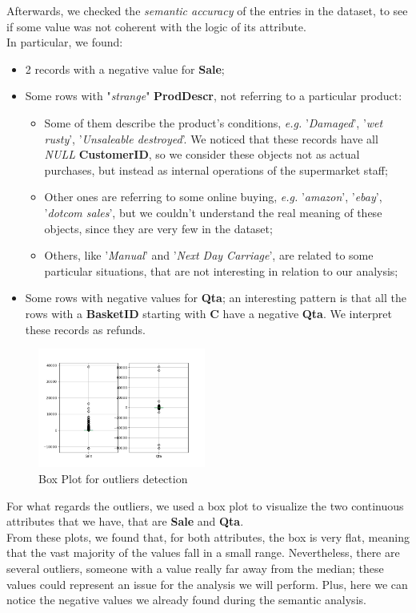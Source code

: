 Afterwards, we checked the \emph{semantic accuracy} of the entries in the dataset, to see if some value was not coherent with the logic of its attribute.\\
In particular, we found:
\begin{itemize}
\item 2 records with a negative value for \textbf{Sale};
\item Some rows with "\emph{strange}" \textbf{ProdDescr}, not referring to a particular product:
	\begin{itemize}
	\item Some of them describe the product's conditions, \emph{e.g.} '\emph{Damaged}', '\emph{wet rusty}', '\emph{Unsaleable destroyed}'. We noticed that these records have all \emph{NULL} \textbf{CustomerID}, so we consider these objects not as actual purchases, but instead as internal operations of the supermarket staff;
	\item Other ones are referring to some online buying, \emph{e.g.} '\emph{amazon}', '\emph{ebay}', '\emph{dotcom sales}', but we couldn't understand the real meaning of these objects, since they are very few in the dataset;
	\item Others, like '\emph{Manual}' and '\emph{Next Day Carriage}', are related to some particular situations, that are not interesting in relation to our analysis;
	\end{itemize}
\item Some rows with negative values for \textbf{Qta}; an interesting pattern is that all the rows with a \textbf{BasketID} starting with \textbf{C} have a negative \textbf{Qta}. We interpret these records as refunds.
\end{itemize}

\begin{figure}
\centering
\includegraphics[width=0.49\textwidth]{img/boxplot_before.png}
\caption{Box Plot for outliers detection}
\end{figure}

For what regards the outliers, we used a box plot to visualize the two continuous attributes that we have, that are \textbf{Sale} and \textbf{Qta}.\\
From these plots, we found that, for both attributes, the box is very flat, meaning that the vast majority of the values fall in a small range. Nevertheless, there are several outliers, someone with a value really far away from the median; these values could represent an issue for the analysis we will perform. Plus, here we can notice the negative values we already found during the semantic analysis.

